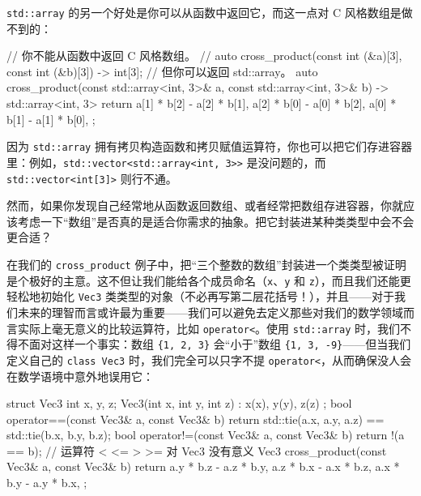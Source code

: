 \texttt{std::\allowbreak{}array} 的另一个好处是你可以从函数中返回它，而这一点对 C 风格数组是做不到的：

\begin{codebox}[cpp]
    // 你不能从函数中返回 C 风格数组。
    // auto cross_product(const int (&a)[3], const int (&b)[3]) -> int[3];
    // 但你可以返回 std::array。
    auto cross_product(const std::array<int, 3>& a,
     const std::array<int, 3>& b) -> std::array<int, 3>
    {
      return {{
        a[1] * b[2] - a[2] * b[1],
        a[2] * b[0] - a[0] * b[2],
        a[0] * b[1] - a[1] * b[0],
      }};
    }
\end{codebox}

因为 \texttt{std::\allowbreak{}array} 拥有拷贝构造函数和拷贝赋值运算符，你也可以把它们存进容器里：例如，\texttt{std::\allowbreak{}vector<\allowbreak{}std::\allowbreak{}array<\allowbreak{}int,\allowbreak{} 3>\allowbreak{}>} 是没问题的，而 \texttt{std::\allowbreak{}vector<\allowbreak{}int[3]>} 则行不通。

然而，如果你发现自己经常地从函数返回数组、或者经常把数组存进容器，你就应该考虑一下“数组”是否真的是适合你需求的抽象。把它封装进某种类类型中会不会更合适？

在我们的 \texttt{cross\_\allowbreak{}product} 例子中，把“三个整数的数组”封装进一个类类型被证明是个极好的主意。这不但让我们能给各个成员命名（\texttt{x}、\texttt{y} 和 \texttt{z}），而且我们还能更轻松地初始化 \texttt{Vec3} 类类型的对象（不必再写第二层花括号！），并且——对于我们未来的理智而言或许最为重要——我们可以避免去定义那些对我们的数学领域而言实际上毫无意义的比较运算符，比如 \texttt{operator<}。使用 \texttt{std::\allowbreak{}array} 时，我们不得不面对这样一个事实：数组 \texttt{\{1,\allowbreak{} 2,\allowbreak{} 3\}} 会“小于”数组 \texttt{\{1,\allowbreak{} 3,\allowbreak{} -9\}}——但当我们定义自己的 \texttt{class Vec3} 时，我们完全可以只字不提 \texttt{operator<}，从而确保没人会在数学语境中意外地误用它：

\begin{codebox}[cpp]
    struct Vec3 {
      int x, y, z;
      Vec3(int x, int y, int z) : x(x), y(y), z(z) {}
    };
    bool operator==(const Vec3& a, const Vec3& b) {
      return std::tie(a.x, a.y, a.z) ==
         std::tie(b.x, b.y, b.z);
    }
    bool operator!=(const Vec3& a, const Vec3& b) {
      return !(a == b);
    }
    // 运算符 < <= > >= 对 Vec3 没有意义
    Vec3 cross_product(const Vec3& a, const Vec3& b) {
      return {
        a.y * b.z - a.z * b.y,
        a.z * b.x - a.x * b.z,
        a.x * b.y - a.y * b.x,
      };
    }
\end{codebox}

